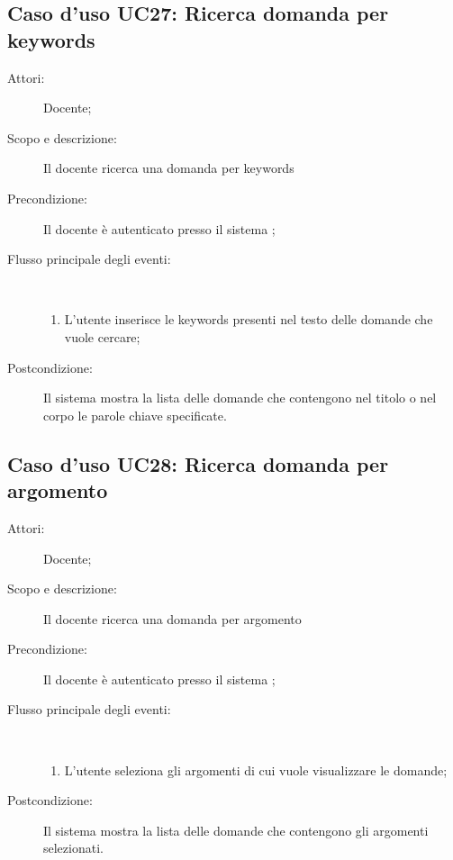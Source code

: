 \subsection{Caso d'uso UC27: Ricerca domanda per keywords}\begin{description}
	\item[Attori:] Docente;
	\item[Scopo e descrizione:] Il docente  ricerca una domanda per keywords
	
	\item[Precondizione:] Il docente è autenticato presso il sistema
	;
	
	\item[Flusso principale degli eventi:] \ 
	\begin{enumerate}
		\item L'utente inserisce le keywords presenti nel testo delle domande che vuole cercare;
		
	\end{enumerate}
	\item[Postcondizione:] Il sistema mostra la lista delle domande che contengono nel titolo o nel corpo le parole chiave specificate.
\end{description}
\hypertarget{UC28}{}
\subsection{Caso d'uso UC28: Ricerca domanda per argomento}\begin{description}
	\item[Attori:] Docente;
	\item[Scopo e descrizione:] Il docente ricerca una domanda per argomento
	\item[Precondizione:] Il docente è autenticato presso il sistema
	;
	
	\item[Flusso principale degli eventi:] \ 
	\begin{enumerate}
		\item L'utente seleziona gli argomenti di cui vuole visualizzare le domande;
		
	\end{enumerate}
	\item[Postcondizione:] Il sistema mostra la lista delle domande che contengono gli argomenti selezionati.
\end{description}
\hypertarget{UC29}{}

